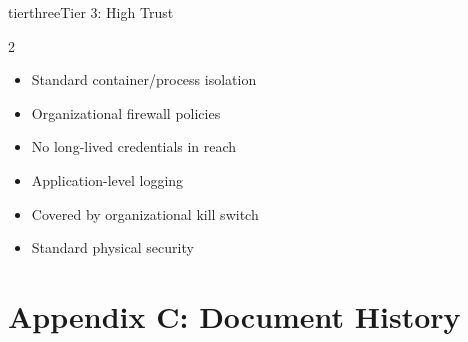 \documentclass[11pt,letterpaper]{article}
\begin{document}
\begin{checkbox}{tierthree}{Tier 3: High Trust}
\small
\begin{multicols}{2}
\begin{itemize}[leftmargin=1.4em, itemsep=0.15em]
  \item[{\color{tierthree!80!black}$\square$}] Standard container/process isolation
  \item[{\color{tierthree!80!black}$\square$}] Organizational firewall policies
  \item[{\color{tierthree!80!black}$\square$}] No long-lived credentials in reach
  \item[{\color{tierthree!80!black}$\square$}] Application-level logging
  \item[{\color{tierthree!80!black}$\square$}] Covered by organizational kill switch
  \item[{\color{tierthree!80!black}$\square$}] Standard physical security
\end{itemize}
\end{multicols}
\end{checkbox}


\section*{Appendix C: Document History}
\end{document}
